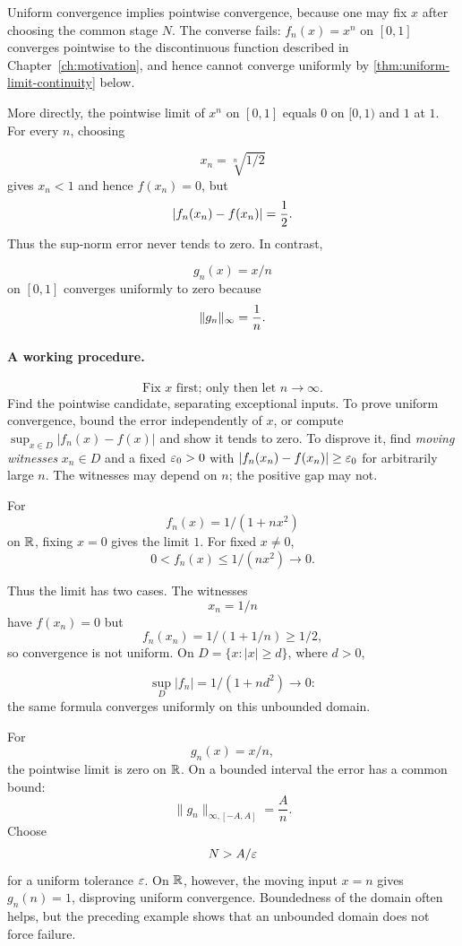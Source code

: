 Uniform convergence implies pointwise convergence, because one may fix $x$ after choosing the common stage $N$. The converse fails: $f_n(x)=x^n$ on $[0,1]$ converges pointwise to the discontinuous function described in Chapter~\ref{ch:motivation}, and hence cannot converge uniformly by \cref{thm:uniform-limit-continuity} below.

More directly, the pointwise limit of $x^n$ on $[0,1]$ equals $0$ on
$[0,1)$ and $1$ at $1$.  For every $n$, choosing

\[
x_n=\sqrt[n]{1/2}
\]
 gives $x_n<1$ and hence $f(x_n)=0$, but
\[
\lvert f_n(x_n)-f(x_n)\rvert=\frac12.
\]
Thus the sup-norm error never tends to zero.  In contrast,

\[
g_n(x)=x/n
\]
 on $[0,1]$ converges uniformly to zero because
\[
\lVert g_n\rVert_\infty=\frac1n.
\]

\paragraph{A working procedure.}
\[
\boxed{\text{Fix }x\text{ first; only then let }n\to\infty.}
\]
Find the pointwise candidate, separating exceptional inputs. To prove
uniform convergence, bound the error independently of $x$, or compute
$\sup_{x\in D}|f_n(x)-f(x)|$ and show it tends to zero.
To disprove it, find \emph{moving witnesses} $x_n\in D$ and a fixed
$\varepsilon_0>0$ with $|f_n(x_n)-f(x_n)|\geq\varepsilon_0$ for arbitrarily
large $n$. The witnesses may depend on $n$; the positive gap may not.

\begin{example}
For
\[
f_n(x)=1/(1+nx^2)
\]
 on $\mathbb{R}$, fixing $x=0$ gives the limit $1$.
For fixed $x\ne0$,
\[
0<f_n(x)\leq1/(nx^2)\to0.
\]

Thus the limit has two cases. The witnesses
\[
x_n=1/n
\]
 have
$f(x_n)=0$ but
\[
f_n(x_n)=1/(1+1/n)\geq1/2,
\]
 so convergence is
not uniform. On $D=\{x:|x|\geq d\}$, where $d>0$,

\[
\sup_D|f_n|=1/(1+nd^2)\to0:
\]
 the same formula converges uniformly
on this unbounded domain.

For
\[
g_n(x)=x/n,
\]
 the pointwise limit is zero on $\mathbb{R}$.
On a bounded interval the error has a common bound:
\[
\|g_n\|_{\infty,[-A,A]}=\frac An.
\]
Choose
\[
N>A/\varepsilon
\]
 for a uniform tolerance $\varepsilon$. On $\mathbb{R}$, however,
the moving input $x=n$ gives $g_n(n)=1$, disproving uniform convergence. Boundedness of the domain often helps, but the preceding
example shows that an unbounded domain does not force failure.
\end{example}

